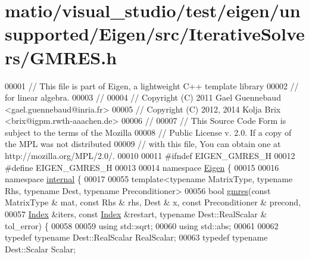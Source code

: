 \hypertarget{matio_2visual__studio_2test_2eigen_2unsupported_2_eigen_2src_2_iterative_solvers_2_g_m_r_e_s_8h_source}{}\section{matio/visual\+\_\+studio/test/eigen/unsupported/\+Eigen/src/\+Iterative\+Solvers/\+G\+M\+R\+ES.h}
\label{matio_2visual__studio_2test_2eigen_2unsupported_2_eigen_2src_2_iterative_solvers_2_g_m_r_e_s_8h_source}

\begin{DoxyCode}
00001 \textcolor{comment}{// This file is part of Eigen, a lightweight C++ template library}
00002 \textcolor{comment}{// for linear algebra.}
00003 \textcolor{comment}{//}
00004 \textcolor{comment}{// Copyright (C) 2011 Gael Guennebaud <gael.guennebaud@inria.fr>}
00005 \textcolor{comment}{// Copyright (C) 2012, 2014 Kolja Brix <brix@igpm.rwth-aaachen.de>}
00006 \textcolor{comment}{//}
00007 \textcolor{comment}{// This Source Code Form is subject to the terms of the Mozilla}
00008 \textcolor{comment}{// Public License v. 2.0. If a copy of the MPL was not distributed}
00009 \textcolor{comment}{// with this file, You can obtain one at http://mozilla.org/MPL/2.0/.}
00010 
00011 \textcolor{preprocessor}{#ifndef EIGEN\_GMRES\_H}
00012 \textcolor{preprocessor}{#define EIGEN\_GMRES\_H}
00013 
00014 \textcolor{keyword}{namespace }\hyperlink{namespace_eigen}{Eigen} \{
00015 
00016 \textcolor{keyword}{namespace }\hyperlink{namespaceinternal}{internal} \{
00017 
00055 \textcolor{keyword}{template}<\textcolor{keyword}{typename} MatrixType, \textcolor{keyword}{typename} Rhs, \textcolor{keyword}{typename} Dest, \textcolor{keyword}{typename} Preconditioner>
00056 \textcolor{keywordtype}{bool} \hyperlink{namespace_eigen_1_1internal_a851df31ae9133639a8eb3f6a8484bbf7}{gmres}(\textcolor{keyword}{const} MatrixType & mat, \textcolor{keyword}{const} Rhs & rhs, Dest & x, \textcolor{keyword}{const} Preconditioner & precond,
00057     \hyperlink{namespace_eigen_a62e77e0933482dafde8fe197d9a2cfde}{Index} &iters, \textcolor{keyword}{const} \hyperlink{namespace_eigen_a62e77e0933482dafde8fe197d9a2cfde}{Index} &restart, \textcolor{keyword}{typename} Dest::RealScalar & tol\_error) \{
00058 
00059   \textcolor{keyword}{using} std::sqrt;
00060   \textcolor{keyword}{using} std::abs;
00061 
00062   \textcolor{keyword}{typedef} \textcolor{keyword}{typename} Dest::RealScalar RealScalar;
00063   \textcolor{keyword}{typedef} \textcolor{keyword}{typename} Dest::Scalar Scalar;

\end{DoxyCode}
